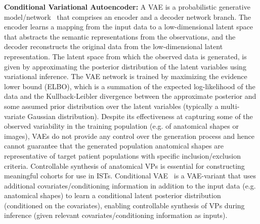 \documentclass[runningheads]{llncs}
\begin{document}
\textbf{Conditional Variational Autoencoder:} A VAE is a probabilistic generative model/network~\cite{kingma2013auto} that comprises an encoder and a decoder network branch. The encoder learns a mapping from the input data to a low-dimensional latent space that abstracts the semantic representations from the observations, and the decoder reconstructs the original data from the low-dimensional latent representation. The latent space from which the observed data is generated, is given by approximating the posterior distribution of the latent variables using variational inference. The VAE network is trained by maximizing the evidence lower bound (ELBO), which is a summation of the expected log-likelihood of the data and the Kullback-Leibler divergence between the approximate posterior and some assumed prior distribution over the latent variables (typically a multi-variate Gaussian distribution). Despite its effectiveness at capturing some of the observed variability in the training population (e.g. of anatomical shapes or images), VAEs do not provide any control over the generation process and hence cannot guarantee that the generated population anatomical shapes are representative of target patient populations with specific inclusion/exclusion criteria. Controllable synthesis of anatomical VPs is essential for constructing meaningful cohorts for use in ISTs. Conditional VAE~\cite{sohn2015learning} is a VAE-variant that uses additional covariates/conditioning information in addition to the input data (e.g. anatomical shapes) to learn a conditional latent posterior distribution (conditioned on the covariates), enabling controllable synthesis of VPs during inference (given relevant covariates/conditioning information as inputs).
\end{document}
